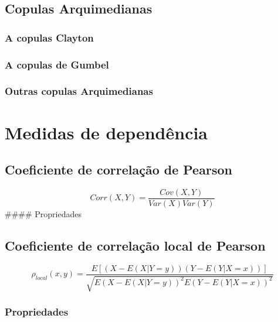 \documentclass[
	12pt,				%
	oneside,			%
	a4paper,			%
	chapter=TITLE,		%
	section=TITLE,		%
	english,			%
	brazil				%
	]{abntex2}
\begin{document}
\hypertarget{copulas-arquimedianas}{%
\subsection{Copulas Arquimedianas}\label{copulas-arquimedianas}}

\hypertarget{a-copulas-clayton}{%
\subsubsection{A copulas Clayton}\label{a-copulas-clayton}}

\hypertarget{a-copulas-de-gumbel}{%
\subsubsection{A copulas de Gumbel}\label{a-copulas-de-gumbel}}

\hypertarget{outras-copulas-arquimedianas}{%
\subsubsection{Outras copulas Arquimedianas}\label{outras-copulas-arquimedianas}}

\hypertarget{medidas-de-dependuxeancia}{%
\section{Medidas de dependência}\label{medidas-de-dependuxeancia}}

\hypertarget{coeficiente-de-correlauxe7uxe3o-de-pearson}{%
\subsection{Coeficiente de correlação de Pearson}\label{coeficiente-de-correlauxe7uxe3o-de-pearson}}

\[Corr(X, Y ) = \frac{Cov(X, Y )}{Var(X)Var(Y)}\]
\#\#\#\# Propriedades

\hypertarget{coeficiente-de-correlauxe7uxe3o-local-de-pearson}{%
\subsection{Coeficiente de correlação local de Pearson}\label{coeficiente-de-correlauxe7uxe3o-local-de-pearson}}

\[\rho_{local}(x, y) = \frac{E[(X - E(X|Y = y))(Y - E(Y|X = x))]}{\sqrt{E(X - E(X|Y = y))^2 E(Y - E(Y |X = x))^2}}\]

\hypertarget{propriedades}{%
\subsubsection{Propriedades}\label{propriedades}}
\end{document}
